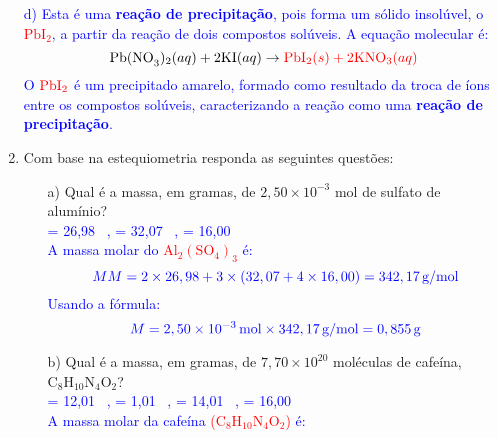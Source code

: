 \documentclass[a4paper, 12pt]{article}
\begin{document}
\begin{enumerate}
    \item[\textcolor{blue}{d)}] \textcolor{blue}{Esta é uma \textbf{reação de precipitação}, pois forma um sólido insolúvel, o \textcolor{red}{\(\text{PbI}_{2}\)}, a partir da reação de dois compostos solúveis. A equação molecular é:}
          \[
              \text{Pb(NO}_{3})_{2}(aq) + 2\text{KI}(aq) \rightarrow \textcolor{red}{\text{PbI}_{2}(s) + 2\text{KNO}_{3}(aq)}
          \]
          \textcolor{blue}{O \(\textcolor{red}{\text{PbI}_{2}}\) é um precipitado amarelo, formado como resultado da troca de íons entre os compostos solúveis, caracterizando a reação como uma \textbf{reação de precipitação}.}

    \item Com base na estequiometria responda as seguintes questões:
          \begin{enumerate}[align=left, labelsep=-0.5em]
              \item[a)] Qual é a massa, em gramas, de \(2,50 \times 10^{-3}\) mol de sulfato de alumínio?
                    \\[10pt]
                    \textcolor{blue}{\textcolor{red}{} = 26,98 \, , \quad \textcolor{red}{} = 32,07 \, , \quad \textcolor{red}{} = 16,00 \, }
                    \\[10pt]
                    \textcolor{blue}{A massa molar do \textcolor{red}{\(\text{Al}_2(\text{SO}_4)_3\)} é:}
                    \[
                        \textcolor{blue}{\text{$MM$} = 2 \times 26,98 + 3 \times (32,07 + 4 \times 16,00) = 342,17 \, \text{g/mol}}
                    \]
                    \textcolor{blue}{Usando a fórmula:}
                    \[
                        \textcolor{blue}{\text{$M$} = 2,50 \times 10^{-3} \, \text{mol} \times 342,17 \, \text{g/mol} = 0,855 \, \text{g}}
                    \]
              \item[b)] Qual é a massa, em gramas, de \(7,70 \times 10^{20}\) moléculas de cafeína, \(\text{C}_{8}\text{H}_{10}\text{N}_{4}\text{O}_{2}\)?
                    \\[10pt]
                    \textcolor{blue}{\textcolor{red}{} = 12,01 \, , \quad \textcolor{red}{} = 1,01 \, , \quad \textcolor{red}{} = 14,01 \, , \quad \textcolor{red}{} = 16,00 \, }
                    \\[10pt]
                    \textcolor{blue}{A massa molar da cafeína \textcolor{red}{(\(\text{C}_{8}\text{H}_{10}\text{N}_{4}\text{O}_{2}\))} é:}

\end{enumerate}
\end{enumerate}
\end{document}
